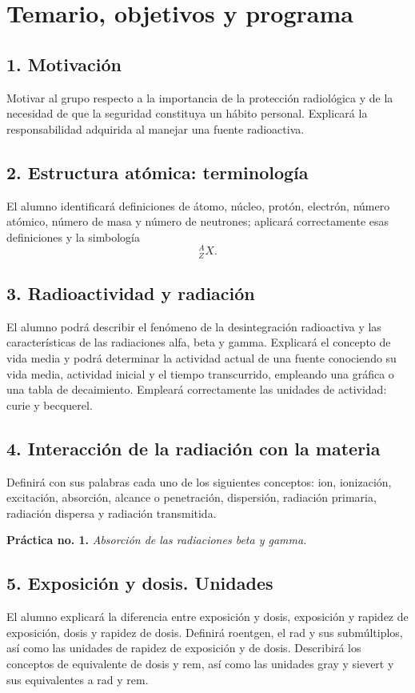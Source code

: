 \chapter*{Temario, objetivos y programa}

\section*{1. Motivación }
Motivar al grupo respecto a la importancia de la protección radiológica y de la necesidad de que la seguridad constituya un hábito personal. Explicará la responsabilidad adquirida al manejar una fuente radioactiva.

\section*{2. Estructura atómica: terminología }
El alumno identificará definiciones de átomo, núcleo, protón, electrón, número atómico, número de masa y número de neutrones; aplicará correctamente esas definiciones y la simbología
\[
{}^{A}_{Z}X.
\]

\section*{3. Radioactividad y radiación }
El alumno podrá describir el fenómeno de la desintegración radioactiva y las características de las radiaciones alfa, beta y gamma. Explicará el concepto de vida media y podrá determinar la actividad actual de una fuente conociendo su vida media, actividad inicial y el tiempo transcurrido, empleando una gráfica o una tabla de decaimiento. Empleará correctamente las unidades de actividad: curie y becquerel.

\section*{4. Interacción de la radiación con la materia }
Definirá con sus palabras cada uno de los siguientes conceptos: ion, ionización, excitación, absorción, alcance o penetración, dispersión, radiación primaria, radiación dispersa y radiación transmitida.

\textbf{Práctica no. 1.} \emph{Absorción de las radiaciones beta y gamma.} 

\section*{5. Exposición y dosis. Unidades }
El alumno explicará la diferencia entre exposición y dosis, exposición y rapidez de exposición, dosis y rapidez de dosis. Definirá roentgen, el rad y sus submúltiplos, así como las unidades de rapidez de exposición y de dosis. Describirá los conceptos de equivalente de dosis y rem, así como las unidades gray y sievert y sus equivalentes a rad y rem.

